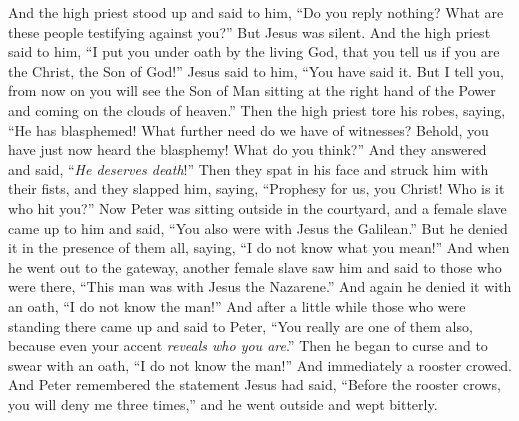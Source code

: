 \begin{biblechapter}
\verse And the high priest stood up and said to him, “Do you reply nothing? What are these people testifying against you?”
\verse But Jesus was silent. And the high priest said to him, “I put you under oath by the living God, that you tell us if you are the Christ, the Son of God!”
\verse Jesus said to him, “You have said it. But I tell you, from now on you will see the Son of Man sitting at the right hand of the Power and coming on the clouds of heaven.”
\verse Then the high priest tore his robes, saying, “He has blasphemed! What further need do we have of witnesses? Behold, you have just now heard the blasphemy!
\verse What do you think?” And they answered and said, “\textit{He deserves death}!”
\verse Then they spat in his face and struck him with their fists, and they slapped him,
\verse saying, “Prophesy for us, you Christ! Who is it who hit you?”
 Now Peter was sitting outside in the courtyard, and a female slave came up to him and said, “You also were with Jesus the Galilean.”
\verse But he denied it in the presence of them all, saying, “I do not know what you mean!”
\verse And when he went out to the gateway, another female slave saw him and said to those who were there, “This man was with Jesus the Nazarene.”
\verse And again he denied it with an oath, “I do not know the man!”
\verse And after a little while those who were standing there came up and said to Peter, “You really are one of them also, because even your accent \textit{reveals who you are}.”
\verse Then he began to curse and to swear with an oath, “I do not know the man!” And immediately a rooster crowed.
\verse And Peter remembered the statement Jesus had said, “Before the rooster crows, you will deny me three times,” and he went outside and wept bitterly.
\end{biblechapter}


